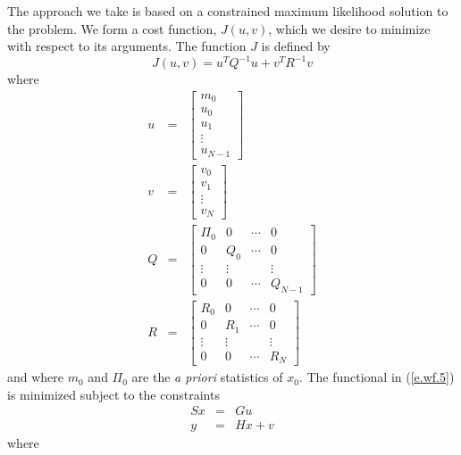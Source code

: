 	The approach we take is based on a constrained
maximum likelihood solution to the problem. We form a cost 
function, $J(u,v)$, which we desire to minimize
with respect to its arguments.  The function $J$ is
defined by
%
\begin{equation}
J(u,v)=u^TQ^{-1}u+v^TR^{-1}v
\label{e.wf.5}
\end{equation}
%
where 
%
\begin{eqnarray}
u&=&\left[\begin{array}{c}
m_0\\
u_0\\
u_1\\
\vdots\\
u_{N-1}\end{array}\right]\nonumber\\
v&=&\left[\begin{array}{c}
v_0\\
v_1\\
\vdots\\
v_N\end{array}\right]\nonumber\\
Q&=&\left[\begin{array}{cccc}
\Pi_0&0&\cdots&0\\
0&Q_0&\cdots&0\\
\vdots&\vdots&&\vdots\\
0&0&\cdots&Q_{N-1}\end{array}\right]\nonumber\\
R&=&\left[\begin{array}{cccc}
R_0&0&\cdots&0\\
0&R_1&\cdots&0\\
\vdots&\vdots&&\vdots\\
0&0&\cdots&R_N\end{array}\right]
\label{e.wf.5a}
\end{eqnarray}
%
and where $m_0$ and $\Pi_0$ are the {\em a priori} statistics of $x_0$.
The functional in (\ref{e.wf.5})
is minimized subject to the constraints
%
\begin{eqnarray}
Sx&=&Gu\nonumber\\
y&=&Hx+v
\label{e.wf.6}
\end{eqnarray}
%
where 
%
